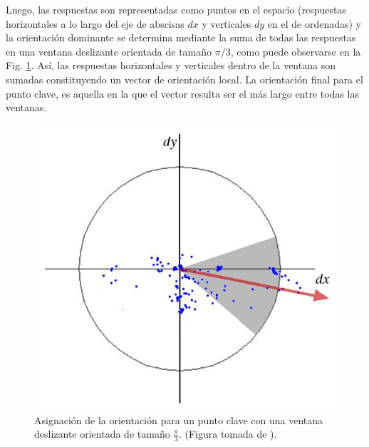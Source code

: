     Luego, las respuestas son representadas como puntos en el espacio (respuestas horizontales a lo largo del eje de abscisas $dx$ y verticales $dy$ en el de ordenadas) y la orientación dominante se determina mediante la suma de todas las respuestas en una ventana deslizante orientada de tamaño $\pi/3$, como puede observarse en la Fig. \ref{fig:responsecalculate}. Así, las respuestas horizontales y verticales dentro de la ventana son sumadas constituyendo un vector de orientación local. La orientación final para el punto clave, es aquella en la que el vector resulta ser el más largo entre todas las ventanas.
% 
    \begin{figure}[tbhp]
      \centering
	    \includegraphics[scale=0.45]{./figs/responsecalculate}
	\caption[Asignación de la orientación para un punto clave]{Asignación de la orientación para un punto clave con una ventana deslizante orientada de tamaño $\frac{\pi}{3}$. (Figura tomada de \cite{Bay:2008:SRF}).}
      \label{fig:responsecalculate}                %
    \end{figure}
